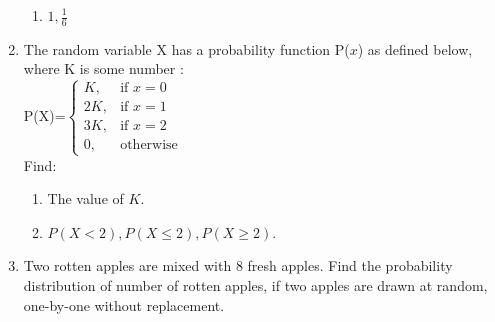 \begin{enumerate}
\begin{enumerate}
\item $1, \frac{1}{6}$
\end{enumerate}
\item The random variable X has a probability function P($x$) as defined below, where K is some number :
\\ P(X)=$\begin{cases} K, & \text{if }  x=0 \\ 2K, & \text{if } x=1\\ 3K, & \text{if } x=2\\ 0, & \text{otherwise  } \end{cases}$ 
\\ Find:
\begin{enumerate}
\item The value of $K$.
\item $P(X<2),P(X \le 2), P(X \ge 2)$.
\end{enumerate}
\item Two rotten apples are mixed with 8 fresh apples. Find the probability distribution of number of rotten apples, if two apples are drawn at  random, one-by-one without replacement.
\end{enumerate}
